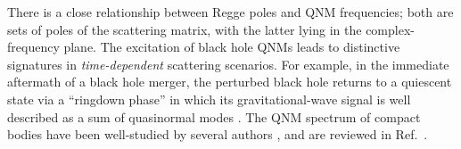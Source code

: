\documentclass[aps,prd,longbibliography,reprint,twocolumn,amsmath,amssymb,amsfonts,showpacs,footnote,superscriptaddress]{revtex4-1}%
\begin{document}
There is a close relationship between Regge poles and QNM frequencies; both are sets of poles of the scattering matrix, with the latter lying in the complex-frequency plane. The excitation of black hole QNMs leads to distinctive signatures in \emph{time-dependent} scattering scenarios. For example, in the immediate aftermath of a black hole merger, the perturbed black hole returns to a quiescent state via a ``ringdown phase'' in which its gravitational-wave signal is well described as a sum of quasinormal modes \cite{Giesler:2019uxc}. The QNM spectrum of compact bodies have been well-studied by several authors  \cite{Detweiler:1985zz, Kokkotas:1986gd, Chandrasekhar449, Kokkotas:1992ka, Leins:1993zz, Andersson:1995ez, Andersson1996}, and are reviewed in Ref.~\cite{Kokkotas:1999bd}.

\end{document}
